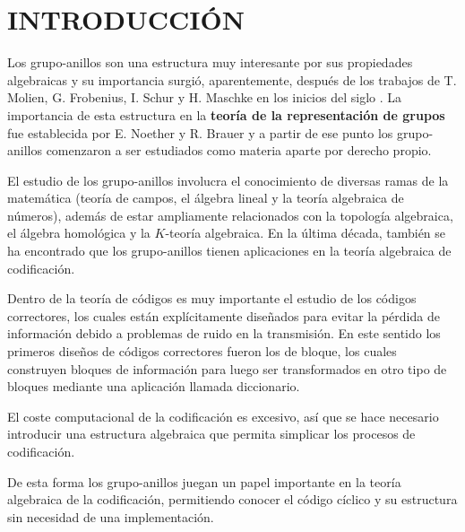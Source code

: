 \chapter{INTRODUCCIÓN}
Los grupo-anillos son una estructura muy interesante por sus propiedades algebraicas y su importancia surgió, aparentemente, después de los trabajos de T. Molien, G. Frobenius, I. Schur y H. Maschke en los inicios del siglo . La importancia de esta estructura en la \textbf{teoría de la representación de grupos} fue establecida por E. Noether y R. Brauer y a partir de ese punto los grupo-anillos comenzaron a ser estudiados como materia aparte por derecho propio. 

El estudio de los grupo-anillos involucra el conocimiento de diversas ramas de la matemática (teoría de campos, el álgebra lineal y la teoría algebraica de números), además de estar ampliamente relacionados con la topología algebraica, el álgebra homológica y la $K$-teoría algebraica. En la última década, también se ha encontrado que los grupo-anillos tienen aplicaciones en la teoría algebraica de codificación.

Dentro de la teoría de códigos es muy importante el estudio de los códigos correctores, los cuales están explícitamente diseñados para evitar la pérdida de información debido a problemas de ruido en la transmisión. En este sentido los primeros diseños de códigos correctores fueron los de bloque, los cuales construyen bloques de información para luego ser transformados en otro tipo de bloques mediante una aplicación llamada diccionario. 

El coste computacional de la codificación es excesivo, así que se hace necesario introducir una estructura algebraica que permita simplicar los procesos de codificación. 

\newpage De esta forma los grupo-anillos juegan un papel importante en la teoría algebraica de la codificación, permitiendo conocer el código cíclico y su estructura sin necesidad de una implementación.

